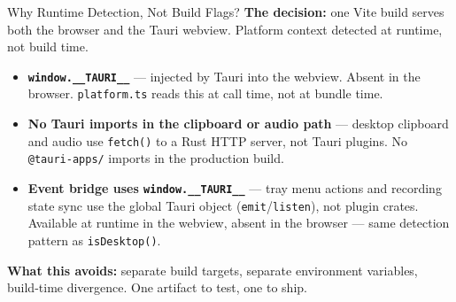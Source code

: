 \documentclass{beamer}
\begin{document}
\begin{frame}{Why Runtime Detection, Not Build Flags?}
    \small
    \textbf{The decision:} one Vite build serves both the browser and the Tauri webview.
    Platform context detected at runtime, not build time.

    \vspace{0.4em}
    \begin{itemize}\setlength{\itemsep}{3pt}
        \item \textbf{\texttt{window.\_\_TAURI\_\_}} --- injected by Tauri into the webview.
              Absent in the browser. \texttt{platform.ts} reads this at call time, not
              at bundle time.

        \item \textbf{No Tauri imports in the clipboard or audio path} --- desktop
              clipboard and audio use \texttt{fetch()} to a Rust HTTP server, not
              Tauri plugins. No \texttt{@tauri-apps/} imports in the production build.

        \item \textbf{Event bridge uses \texttt{window.\_\_TAURI\_\_}} --- tray menu
              actions and recording state sync use the global Tauri object
              (\texttt{emit}/\texttt{listen}), not plugin crates. Available at
              runtime in the webview, absent in the browser --- same detection
              pattern as \texttt{isDesktop()}.
    \end{itemize}

    \vspace{0.3em}
    \textbf{What this avoids:} separate build targets, separate environment variables,
    build-time divergence. One artifact to test, one to ship.
\end{frame}
\end{document}
